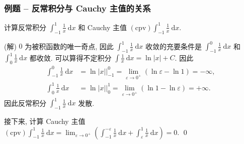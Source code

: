 
\begin{frame}
\frametitle{例题 -- 反常积分与 Cauchy 主值的关系}

\begin{eg}
计算反常积分 $\int_{-1}^1 \frac{1}{x} ~ \mathrm{d} x$ 和 Cauchy 主值 $\mathrm{(cpv)} \int_{-1}^1 \frac{1}{x} ~ \mathrm{d} x$.
\end{eg}

\pause
\vspace{0.5em}

\startproof[bg=yellow, fg=red](解)
$0$ 为被积函数的唯一奇点, 因此 $\int_{-1}^1 \frac{1}{x} ~ \mathrm{d} x$ 收敛的充要条件是 $\int_{-1}^0 \frac{1}{x} ~ \mathrm{d} x$ 和 $\int_0^1 \frac{1}{x} ~ \mathrm{d} x$ 都收敛. 可以算得不定积分 $\int \frac{1}{x} ~ \mathrm{d} x = \ln |x| + C$. 因此
\begin{align*}
\int_{-1}^0 \frac{1}{x} ~ \mathrm{d} x & = \left. \ln |x| \right|_{-1}^0 = \lim_{\varepsilon \to 0^+} \left(\ln \varepsilon - \ln 1\right) = -\infty, \\
\int_0^1 \frac{1}{x} ~ \mathrm{d} x & = \left. \ln |x| \right|_0^1 = \lim_{\varepsilon \to 0^+} \left(\ln 1 - \ln \varepsilon\right) = +\infty.
\end{align*}
因此反常积分 $\int_{-1}^1 \frac{1}{x} ~ \mathrm{d} x$ 发散.

\pause
\vspace{0.5em}

接下来, 计算 Cauchy 主值 $\mathrm{(cpv)} \int_{-1}^1 \frac{1}{x} ~ \mathrm{d} x = \lim_{\varepsilon \to 0^+} \left( \int_{-1}^{-\varepsilon} \frac{1}{x} ~ \mathrm{d} x + \int_{\varepsilon}^1 \frac{1}{x} ~ \mathrm{d} x \right) = 0.$
\qed

\end{frame}



